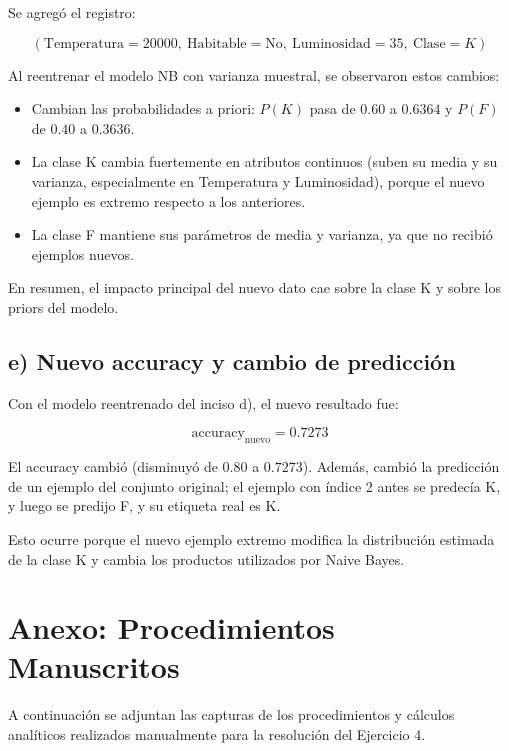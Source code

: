 \documentclass[11pt,a4paper]{article}
\begin{document}
Se agregó el registro:

\[
(\text{Temperatura}=20000,\ \text{Habitable}=\text{No},\ \text{Luminosidad}=35,\ \text{Clase}=K)
\]

Al reentrenar el modelo NB con varianza muestral, se observaron estos cambios:

\begin{itemize}
    \item Cambian las probabilidades a priori: $P(K)$ pasa de $0.60$ a $0.6364$ y $P(F)$ de $0.40$ a $0.3636$.
    \item La clase K cambia fuertemente en atributos continuos (suben su media y su varianza, especialmente en Temperatura y Luminosidad), porque el nuevo ejemplo es extremo respecto a los anteriores.
    \item La clase F mantiene sus parámetros de media y varianza, ya que no recibió ejemplos nuevos.
\end{itemize}

En resumen, el impacto principal del nuevo dato cae sobre la clase K y sobre los priors del modelo.

\subsection*{e) Nuevo accuracy y cambio de predicción}

Con el modelo reentrenado del inciso d), el nuevo resultado fue:

\[
\text{accuracy}_{\text{nuevo}} = 0.7273
\]

El accuracy cambió (disminuyó de $0.80$ a $0.7273$). Además, cambió la predicción de un ejemplo del conjunto original; el ejemplo con índice 2 antes se predecía K, y luego se predijo F, y su etiqueta real es K.


Esto ocurre porque el nuevo ejemplo extremo modifica la distribución estimada de la clase K y cambia los productos utilizados por Naive Bayes.



\newpage
\section*{Anexo: Procedimientos Manuscritos}

A continuación se adjuntan las capturas de los procedimientos y cálculos analíticos realizados manualmente para la resolución del Ejercicio 4.
\end{document}
